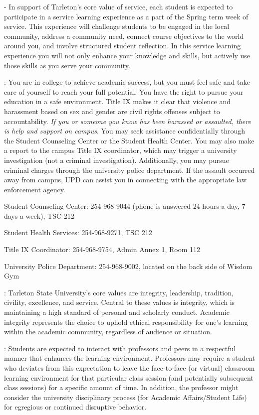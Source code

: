 \documentclass[letterpaper]{article}
\begin{document}
 - In support of Tarleton's core value of service, each student is expected to participate in a service learning experience as a part of the Spring term week of service.  This experience will challenge students to be engaged in the local community, address a community need, connect course objectives to the world around you, and involve structured student reflection. In this service learning experience you will not only enhance your knowledge and skills, but actively use those skills as you serve your community.


: You are in college to achieve academic success, but you must feel safe and take care of yourself to reach your full potential. You have the right to pursue your education in a safe environment. Title IX makes it clear that violence and harassment based on sex and gender are civil rights offenses subject to accountability. \textit{If you or someone you know has been harassed or assaulted, there is help and support on campus}. You may seek assistance confidentially through the Student Counseling Center or the Student Health Center. You may also make a report to the campus Title IX coordinator, which may trigger a university investigation (not a criminal investigation). Additionally, you may pursue criminal charges through the university police department. If the assault occurred away from campus, UPD can assist you in connecting with the appropriate law enforcement agency.
\begin{center}
Student Counseling Center: 254-968-9044 (phone is answered 24 hours a day, 7 days a week), TSC 212

Student Health Services: 254-968-9271, TSC 212 

Title IX Coordinator: 254-968-9754, Admin Annex 1, Room 112

University Police Department: 254-968-9002, located on the back side of Wisdom Gym
\end{center}

:  Tarleton State University's core values are integrity, leadership, tradition, civility, excellence, and service.  Central to these values is integrity, which is maintaining a high standard of personal and scholarly conduct.  Academic integrity represents the choice to uphold ethical responsibility for one's learning within the academic community, regardless of audience or situation.

:  Students are expected to interact with professors and peers in a respectful manner that enhances the learning environment. Professors may require a student who deviates from this expectation to leave the face-to-face (or virtual) classroom learning environment for that particular class session (and potentially subsequent class sessions) for a specific amount of time. In addition, the professor might consider the university disciplinary process (for Academic Affairs/Student Life) for egregious or continued disruptive behavior.
\end{document}
